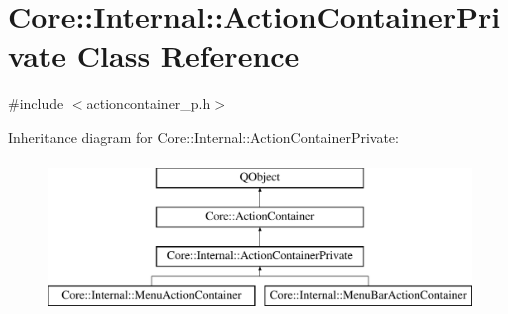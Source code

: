 \hypertarget{class_core_1_1_internal_1_1_action_container_private}{\section{Core\-:\-:Internal\-:\-:Action\-Container\-Private Class Reference}
\label{class_core_1_1_internal_1_1_action_container_private}
}


{\ttfamily \#include $<$actioncontainer\-\_\-p.\-h$>$}

Inheritance diagram for Core\-:\-:Internal\-:\-:Action\-Container\-Private\-:\begin{figure}[H]
\begin{center}
\leavevmode
\includegraphics[height=4.000000cm]{class_core_1_1_internal_1_1_action_container_private}
\end{center}
\end{figure}
